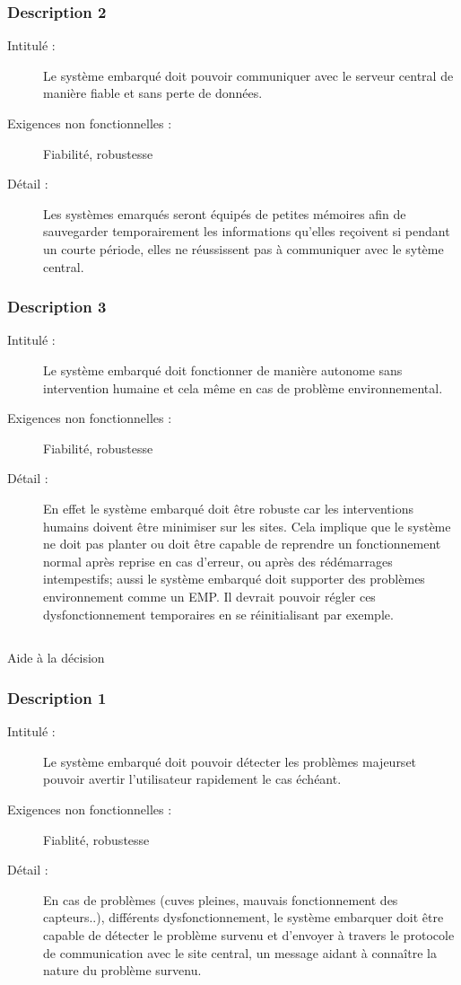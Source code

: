 \subsubsection {Description 2}
\begin{description}
           \item[Intitulé :] Le système embarqué doit pouvoir communiquer avec le serveur central de manière fiable et sans perte de données.
           \item[Exigences non fonctionnelles :] Fiabilité, robustesse
           \item[Détail :] Les systèmes emarqués seront équipés de petites mémoires afin de sauvegarder temporairement les informations
qu'elles reçoivent si pendant un courte période, elles ne réussissent pas à communiquer avec le sytème central.
\end{description}

\subsubsection {Description 3}
\begin{description}
           \item[Intitulé :] Le système embarqué doit fonctionner de manière autonome sans intervention humaine et cela même en cas de problème
environnemental.
           \item[Exigences non fonctionnelles :]Fiabilité, robustesse
           \item[Détail :] En effet le système embarqué doit être robuste car les interventions humains doivent être minimiser sur
les sites. Cela implique que le système ne doit pas planter ou doit être capable de reprendre un fonctionnement normal
après reprise en cas d'erreur, ou après des rédémarrages intempestifs; aussi le système embarqué doit supporter des 
problèmes environnement comme un EMP. Il devrait pouvoir régler ces dysfonctionnement temporaires en se 
réinitialisant par exemple.
\end{description}


 \subsection {}Aide à la décision
 \subsubsection {Description 1}
\begin{description}
           \item[Intitulé :] Le système embarqué doit pouvoir détecter les problèmes majeurset pouvoir avertir l'utilisateur rapidement le cas
échéant.
           \item[Exigences non fonctionnelles :] Fiablité, robustesse
           \item[Détail :] En cas de problèmes (cuves pleines, mauvais fonctionnement des capteurs..), différents dysfonctionnement,
le système embarquer doit être capable de détecter le problème survenu et d'envoyer à travers le protocole de
communication avec le site central, un message aidant à connaître la nature du problème survenu.
\end{description}

